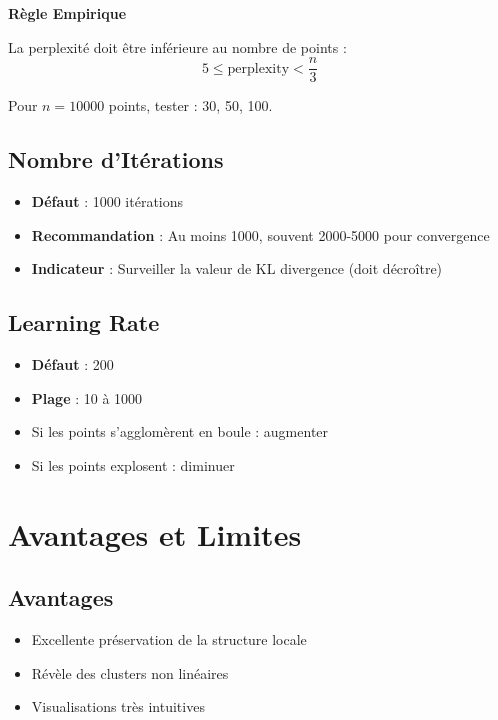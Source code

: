 \documentclass[a4paper,11pt]{article}
\begin{document}
\begin{warningbox}
\textbf{Règle Empirique}

La perplexité doit être inférieure au nombre de points :
$$ 5 \leq \text{perplexity} < \frac{n}{3} $$

Pour $n=10000$ points, tester : 30, 50, 100.
\end{warningbox}

\subsection{Nombre d'Itérations}

\begin{itemize}
    \item \textbf{Défaut} : 1000 itérations
    \item \textbf{Recommandation} : Au moins 1000, souvent 2000-5000 pour convergence
    \item \textbf{Indicateur} : Surveiller la valeur de KL divergence (doit décroître)
\end{itemize}

\subsection{Learning Rate}

\begin{itemize}
    \item \textbf{Défaut} : 200
    \item \textbf{Plage} : 10 à 1000
    \item Si les points s'agglomèrent en boule : augmenter
    \item Si les points explosent : diminuer
\end{itemize}

\section{Avantages et Limites}

\subsection{Avantages}

\begin{itemize}
    \item Excellente préservation de la structure locale
    \item Révèle des clusters non linéaires
    \item Visualisations très intuitives
\end{itemize}
\end{document}
